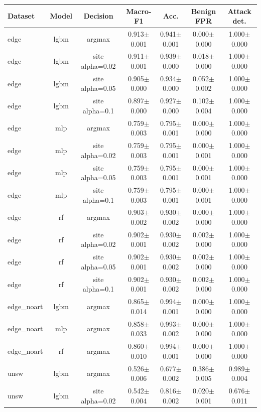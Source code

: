 \begin{tabular}{lcccccc}
\toprule
Dataset & Model & Decision & Macro-F1 & Acc. & Benign FPR & Attack det. \\
\midrule
edge & lgbm & argmax & 0.913$\pm$0.001 & 0.941$\pm$0.001 & 0.000$\pm$0.000 & 1.000$\pm$0.000 \\
edge & lgbm & site alpha=0.02 & 0.911$\pm$0.001 & 0.939$\pm$0.000 & 0.018$\pm$0.000 & 1.000$\pm$0.000 \\
edge & lgbm & site alpha=0.05 & 0.905$\pm$0.000 & 0.934$\pm$0.000 & 0.052$\pm$0.002 & 1.000$\pm$0.000 \\
edge & lgbm & site alpha=0.1 & 0.897$\pm$0.000 & 0.927$\pm$0.000 & 0.102$\pm$0.004 & 1.000$\pm$0.000 \\
edge & mlp & argmax & 0.759$\pm$0.003 & 0.795$\pm$0.001 & 0.000$\pm$0.000 & 1.000$\pm$0.000 \\
edge & mlp & site alpha=0.02 & 0.759$\pm$0.003 & 0.795$\pm$0.001 & 0.000$\pm$0.001 & 1.000$\pm$0.000 \\
edge & mlp & site alpha=0.05 & 0.759$\pm$0.003 & 0.795$\pm$0.001 & 0.000$\pm$0.001 & 1.000$\pm$0.000 \\
edge & mlp & site alpha=0.1 & 0.759$\pm$0.003 & 0.795$\pm$0.001 & 0.000$\pm$0.001 & 1.000$\pm$0.000 \\
edge & rf & argmax & 0.903$\pm$0.002 & 0.930$\pm$0.002 & 0.000$\pm$0.000 & 1.000$\pm$0.000 \\
edge & rf & site alpha=0.02 & 0.902$\pm$0.001 & 0.930$\pm$0.002 & 0.002$\pm$0.000 & 1.000$\pm$0.000 \\
edge & rf & site alpha=0.05 & 0.902$\pm$0.001 & 0.930$\pm$0.002 & 0.002$\pm$0.000 & 1.000$\pm$0.000 \\
edge & rf & site alpha=0.1 & 0.902$\pm$0.001 & 0.930$\pm$0.002 & 0.002$\pm$0.000 & 1.000$\pm$0.000 \\
edge_noart & lgbm & argmax & 0.865$\pm$0.014 & 0.994$\pm$0.001 & 0.000$\pm$0.000 & 1.000$\pm$0.000 \\
edge_noart & mlp & argmax & 0.858$\pm$0.033 & 0.993$\pm$0.002 & 0.000$\pm$0.000 & 1.000$\pm$0.000 \\
edge_noart & rf & argmax & 0.860$\pm$0.010 & 0.994$\pm$0.001 & 0.000$\pm$0.000 & 1.000$\pm$0.000 \\
unsw & lgbm & argmax & 0.526$\pm$0.006 & 0.677$\pm$0.002 & 0.386$\pm$0.005 & 0.989$\pm$0.004 \\
unsw & lgbm & site alpha=0.02 & 0.542$\pm$0.004 & 0.816$\pm$0.002 & 0.020$\pm$0.001 & 0.676$\pm$0.011 \\

\end{tabular}
